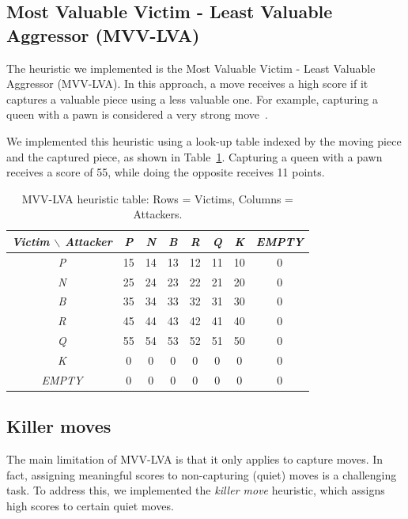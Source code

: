 \subsection{Most Valuable Victim - Least Valuable Aggressor (MVV-LVA)}

The heuristic we implemented is the Most Valuable Victim - Least Valuable Aggressor (MVV-LVA). In this approach, a move receives a high score if it captures a valuable piece using a less valuable one. For example, capturing a queen with a pawn is considered a very strong move~\cite{MVVLVA}.

\vspace{1em}

\noindent We implemented this heuristic using a look-up table indexed by the moving piece and the captured piece, as shown in Table~\ref{tab:mvv-lva-table}. Capturing a queen with a pawn receives a score of 55, while doing the opposite receives 11 points.

\begin{table}[H]
    \centering
    \begin{tabular}{|c|c|c|c|c|c|c|c|}
    \hline
    \textit{Victim $\backslash$ Attacker} & \textit{P} & \textit{N} & \textit{B} & \textit{R} & \textit{Q} & \textit{K} & \textit{EMPTY} \\
    \hline
    \textit{P}     & 15 & 14 & 13 & 12 & 11 & 10 & 0 \\
    \textit{N}     & 25 & 24 & 23 & 22 & 21 & 20 & 0 \\
    \textit{B}     & 35 & 34 & 33 & 32 & 31 & 30 & 0 \\
    \textit{R}     & 45 & 44 & 43 & 42 & 41 & 40 & 0 \\
    \textit{Q}     & 55 & 54 & 53 & 52 & 51 & 50 & 0 \\
    \textit{K}     &  0 &  0 &  0 &  0 &  0 &  0 & 0 \\
    \textit{EMPTY} &  0 &  0 &  0 &  0 &  0 &  0 & 0 \\
    \hline
    \end{tabular}
    \caption{MVV-LVA heuristic table: Rows = Victims, Columns = Attackers.}
    \label{tab:mvv-lva-table}
\end{table}

\newpage

\subsection{Killer moves}

The main limitation of MVV-LVA is that it only applies to capture moves. In fact, assigning meaningful scores to non-capturing (quiet) moves is a challenging task. To address this, we implemented the \textit{killer move} heuristic, which assigns high scores to certain quiet moves.


